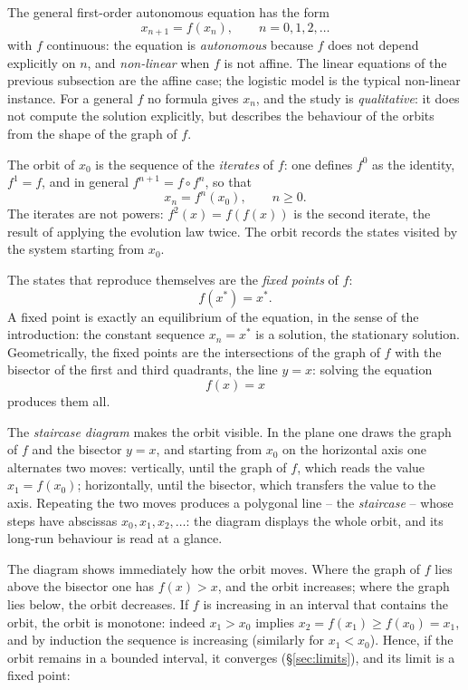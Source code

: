 \documentclass[11pt,a4paper]{article}
\theoremstyle{definition} \newtheorem{definition}{Definition} \theoremstyle{plain} \newtheorem{theorem}{Theorem}
\begin{document}
The general first-order autonomous equation has the form
\[ x_{n+1} = f(x_n), \qquad n = 0, 1, 2, \ldots \]
with $f$ continuous: the equation is \emph{autonomous} because $f$ does
not depend explicitly on $n$, and \emph{non-linear} when $f$ is not
affine. The linear equations of the previous subsection are the affine
case; the logistic model is the typical non-linear instance. For a
general $f$ no formula gives $x_n$, and the study is \emph{qualitative}:
it does not compute the solution explicitly, but describes the behaviour
of the orbits from the shape of the graph of $f$.

The orbit of $x_0$ is the sequence of the \emph{iterates} of $f$: one
defines $f^0$ as the identity, $f^1 = f$, and in general
$f^{n+1} = f\circ f^n$, so that
\[ x_n = f^n(x_0), \qquad n \ge 0. \]
The iterates are not powers: $f^2(x) = f(f(x))$ is the second iterate,
the result of applying the evolution law twice. The orbit records the
states visited by the system starting from $x_0$.

The states that reproduce themselves are the \emph{fixed points} of $f$:
\[ f(x^*) = x^*. \]
A fixed point is exactly an equilibrium of the equation, in the sense of
the introduction: the constant sequence $x_n = x^*$ is a solution, the
stationary solution. Geometrically, the fixed points are the
intersections of the graph of $f$ with the bisector of the first and
third quadrants, the line $y=x$: solving the equation
\[ f(x) = x \]
produces them all.

The \emph{staircase diagram} makes the orbit visible. In the plane one
draws the graph of $f$ and the bisector $y=x$, and starting from $x_0$ on
the horizontal axis one alternates two moves: vertically, until the graph
of $f$, which reads the value $x_1 = f(x_0)$; horizontally, until the
bisector, which transfers the value to the axis. Repeating the two moves
produces a polygonal line -- the \emph{staircase} -- whose steps have
abscissas $x_0, x_1, x_2, \ldots$: the diagram displays the whole orbit,
and its long-run behaviour is read at a glance.

The diagram shows immediately how the orbit moves. Where the graph of
$f$ lies above the bisector one has $f(x)>x$, and the orbit increases;
where the graph lies below, the orbit decreases. If $f$ is increasing in
an interval that contains the orbit, the orbit is monotone: indeed
$x_1>x_0$ implies $x_2=f(x_1)\ge f(x_0)=x_1$, and by induction the
sequence is increasing (similarly for $x_1<x_0$). Hence, if the orbit
remains in a bounded interval, it converges (\S\ref{sec:limits}), and its limit is a
fixed point:
\end{document}
